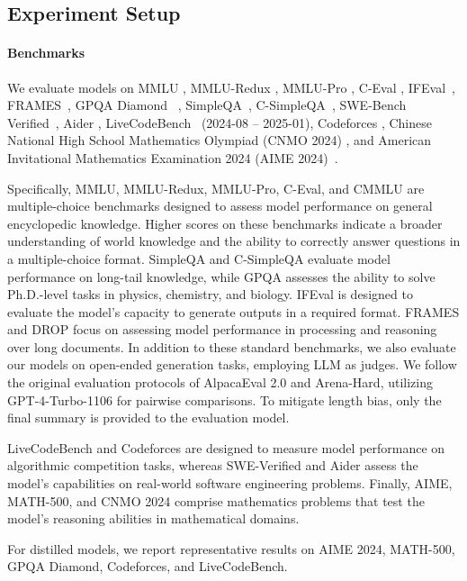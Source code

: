 \subsection{Experiment Setup}

\paragraph{Benchmarks} We evaluate models on MMLU \citep{mmlu}, MMLU-Redux \citep{mmlu_redux}, MMLU-Pro \citep{mmlu_pro}, C-Eval \citep{ceval},  IFEval~\citep{IFeval}, FRAMES~\citep{frames}, GPQA Diamond ~\citep{gpqa}, SimpleQA~\citep{simpleqa}, C-SimpleQA~\citep{csimpleqa}, SWE-Bench Verified~\citep{swe_verified}, Aider \citep{aider}, LiveCodeBench~\citep{livecodebench} (2024-08 -- 2025-01), Codeforces \citep{codeforces}, Chinese National High School Mathematics Olympiad (CNMO 2024) \citep{cnmo}, and American Invitational Mathematics Examination 2024 (AIME 2024)~\citep{AIME2024}. 
% 


Specifically, MMLU, MMLU-Redux, MMLU-Pro, C-Eval, and CMMLU are multiple-choice benchmarks designed to assess model performance on general encyclopedic knowledge. Higher scores on these benchmarks indicate a broader understanding of world knowledge and the ability to correctly answer questions in a multiple-choice format. SimpleQA and C-SimpleQA evaluate model performance on long-tail knowledge, while GPQA assesses the ability to solve Ph.D.-level tasks in physics, chemistry, and biology. IFEval is designed to evaluate the model’s capacity to generate outputs in a required format. FRAMES and DROP focus on assessing model performance in processing and reasoning over long documents. In addition to these standard benchmarks, we also evaluate our models on open-ended generation tasks, employing LLM as judges. We follow the original evaluation protocols of AlpacaEval 2.0 and Arena-Hard, utilizing GPT-4-Turbo-1106 for pairwise comparisons. To mitigate length bias, only the final summary is provided to the evaluation model.

LiveCodeBench and Codeforces are designed to measure model performance on algorithmic competition tasks, whereas SWE-Verified and Aider assess the model’s capabilities on real-world software engineering problems. Finally, AIME, MATH-500, and CNMO 2024 comprise mathematics problems that test the model’s reasoning abilities in mathematical domains.

For distilled models, we report representative results on AIME 2024, MATH-500, GPQA Diamond, Codeforces, and LiveCodeBench.


